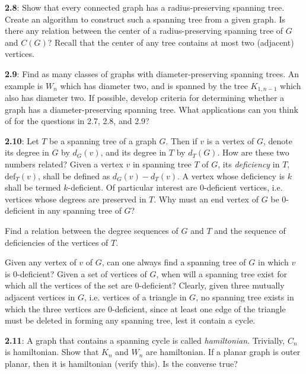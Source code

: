 \documentclass{article}
\begin{document}
\textbf{2.8}: Show that every connected graph has a radius-preserving spanning tree. Create an algorithm to construct such a spanning tree from a given graph. Is there any relation between the center of a radius-preserving spanning tree of $G$ and $C(G)$? Recall that the center of any tree contains at most two (adjacent) vertices.

\vspace{0.5cm}

\textbf{2.9}: Find as many classes of graphs with diameter-preserving spanning trees. An example is $W_n$ which has diameter two, and is spanned by the tree $K_{1,n-1}$ which also has diameter two. If possible, develop criteria for determining whether a graph has a diameter-preserving spanning tree. What applications can you think of for the questions in 2.7, 2.8, and 2.9?

\vspace{0.5cm}

\textbf{2.10}: Let $T$ be a spanning tree of a graph $G$. Then if $v$ is a vertex of $G$, denote its degree in $G$ by $d_G(v)$, and its degree in $T$ by $d_T(G)$. How are these two numbers related? Given a vertex $v$ in spanning tree $T$ of $G$, its \emph{deficiency} in $T$, $\text{def}_T(v)$, shall be defined as $d_G(v)-d_T(v)$. A vertex whose deficiency is $k$ shall be termed $k$-deficient. Of particular interest are $0$-deficient vertices, i.e. vertices whose degrees are preserved in $T$. Why must an end vertex of $G$ be $0$-deficient in any spanning tree of $G$?

Find a relation between the degree sequences of $G$ and $T$ and the sequence of deficiencies of the vertices of $T$.

Given any vertex of $v$ of $G$, can one always find a spanning tree of $G$ in which $v$ is $0$-deficient? Given a set of vertices of $G$, when will a spanning tree exist for which all the vertices of the set are $0$-deficient? Clearly, given three mutually adjacent vertices in $G$, i.e. vertices of a triangle in $G$, no spanning tree exists in which the three vertices are $0$-deficient, since at least one edge of the triangle must be deleted in forming any spanning tree, lest it contain a cycle.

\vspace{0.5cm}

\textbf{2.11}: A graph that contains a spanning cycle is called \emph{hamiltonian}. Trivially, $C_n$ is hamiltonian. Show that $K_n$ and $W_n$ are hamiltonian. If a planar graph is outer planar, then it is hamiltonian (verify this). Is the converse true?
\end{document}
